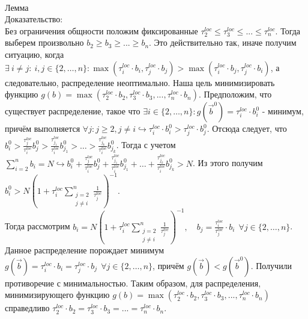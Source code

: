 \documentclass{article}
\begin{document}
\\
Лемма\\
Доказательство:\\
Без ограничения общности положим фиксированные $\tau_2^{loc}\leq \tau_3^{loc}\leq ... \leq \tau_n^{loc}$. Тогда выберем произвольно $ b_2\geq b_3\geq ... \geq b_n$. Это действительно так, иначе получим ситуацию, когда $\exists ~ i \neq j: ~ i, j\in \{2, \ldots, n\} : \max(\tau_i^{loc}\cdot b_i, \tau_j^{loc}\cdot b_j) > \max(\tau_i^{loc}\cdot b_j, \tau_j^{loc}\cdot b_i)$, а следовательно, распределение неоптимально. Наша цель минимизировать функцию $g(b) = \max(\tau_2^{loc}\cdot b_2, \tau_3^{loc}\cdot b_3, ..., \tau_n^{loc}\cdot b_n)$. Предположим,  что существует распределение, такое что $\exists i \in \{2, \ldots, n\}: g(\overrightarrow{b}^0) = \tau_i^{loc}\cdot b_i^0$ - минимум, причём выполняется $\forall j: j \geq 2, j \neq i \hookrightarrow \tau_i^{loc}\cdot b_i^0 > \tau_j^{loc}\cdot b_j^0$. Отсюда следует, что $b_i^0 > \frac{\tau_j^{loc}}{\tau_i^{loc}}b_j^0 > \frac{\tau_{j_1}^{loc}}{\tau_i^{loc}}b_{j_1}^0 > \ldots > \frac{\tau_{j_k}^{loc}}{\tau_i^{loc}}b_{j_k}^0$. Тогда с учетом $\sum\limits_{i = 2}^n b_i = N \hookrightarrow b_i^0 + \frac{\tau_j^{loc}}{\tau_i^{loc}}b_j^0 + \frac{\tau_{j_1}^{loc}}{\tau_i^{loc}}b_{j_1}^0 + \ldots + \frac{\tau_{j_k}^{loc}}{\tau_i^{loc}}b_{j_k}^0 > N$. Из этого получим $b_i^0 > N(1 + \tau_i^{loc}\sum\limits_{\substack{j = 2 \\ j \neq i}}^n \frac{1}{\tau_j^{loc}})^{-1}$. 
\\
Тогда рассмотрим $b_i = N(1 + \tau_i^{loc}\sum\limits_{\substack{j = 2 \\ j \neq i}}^n \frac{1}{\tau_j^{loc}})^{-1}, \quad b_j = \frac {\tau_i^{loc}}{\tau_j^{loc}}\cdot b_i  ~~ \forall j \in \{2,\ldots,n\}$. Данное распределение порождает минимум  $g(\overrightarrow{b}) = \tau_i^{loc}\cdot b_i = \tau_j^{loc}\cdot b_j ~~ \forall j \in \{2,\ldots,n\}$, причём $g(\overrightarrow{b}) < g(\overrightarrow{b}^0)$. Получили противоречие с минимальностью. Таким образом, для  распределения, минимизирующего функцию $g(b) = \max(\tau_2^{loc}\cdot b_2, \tau_3^{loc}\cdot b_3, ..., \tau_n^{loc}\cdot b_n)$ справедливо $\tau_2^{loc}\cdot b_2 = \tau_3^{loc}\cdot b_3 = ... = \tau_n^{loc}\cdot b_n$.
\\
\\
\\
\end{document}
